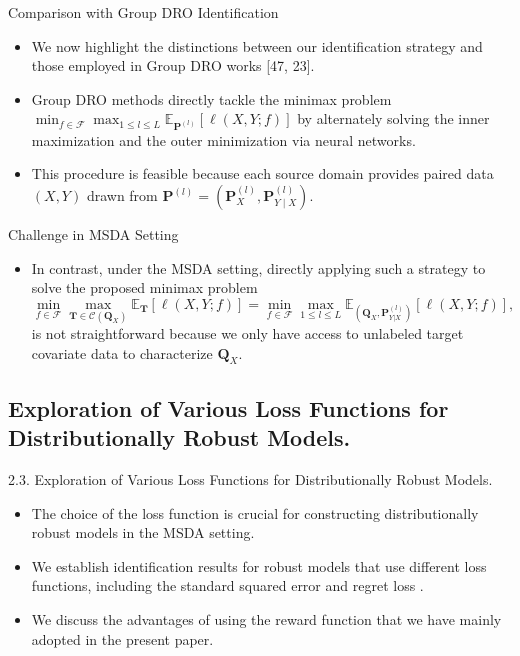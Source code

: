 \documentclass{beamer}
\begin{document}
\begin{frame}{Comparison with Group DRO Identification}
    \begin{itemize}
        \item We now highlight the distinctions between our identification strategy and those employed in Group DRO works [47, 23].
        \item Group DRO methods directly tackle the minimax problem $\min_{f \in \mathcal{F}} \max_{1 \leq l \leq L} \mathbb{E}_{\mathbf{P}^{(l)}}[ \ell\left(X, Y; f \right) ]$ by alternately solving the inner maximization and the outer minimization via neural networks.
        \item This procedure is feasible because each source domain provides paired data $(X, Y)$ drawn from $\mathbf{P}^{(l)} = (\mathbf{P}_{X}^{(l)}, \mathbf{P}_{Y \mid X}^{(l)})$.
    \end{itemize}
\end{frame}

\begin{frame}{Challenge in MSDA Setting}
    \begin{itemize}
        \item In contrast, under the MSDA setting, directly applying such a strategy to solve the proposed minimax problem
        \[
        \min_{f \in \mathcal{F}} \max_{\mathbf{T} \in \mathcal{C}(\mathbf{Q}_{X})} \mathbb{E}_{\mathbf{T}}[ \ell(X, Y; f) ] = \min_{f \in \mathcal{F}} \max_{1 \leq l \leq L} \mathbb{E}_{(\mathbf{Q}_{X}, \mathbf{P}_{Y | X}^{(l)})}[ \ell(X, Y; f) ],
        \]
        is not straightforward because we only have access to unlabeled target covariate data to characterize $\mathbf{Q}_X$.
    \end{itemize}
\end{frame}
\subsection{Exploration of Various Loss Functions for Distributionally Robust Models.}

\begin{frame}{2.3. Exploration of Various Loss Functions for Distributionally Robust Models.}
    \begin{itemize}
        \item The choice of the loss function is crucial for constructing distributionally robust models in the MSDA setting.
        \item We establish identification results for robust models that use different loss functions, including the standard squared error and regret loss \cite{1}.
        \item We discuss the advantages of using the reward function that we have mainly adopted in the present paper.
    \end{itemize}
\end{frame}
\end{document}
